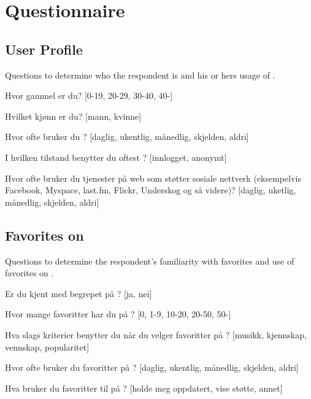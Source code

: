 \chapter{Questionnaire}
\label{appendix:questionnaire}

\section{User Profile}

Questions to determine who the respondent is and his or hers usage of
\urort{}.

\begin{items}
  \item Hvor gammel er du? [0-19, 20-29, 30-40, 40-]
  \item Hvilket kjønn er du? [mann, kvinne]
  \item Hvor ofte bruker du \urort{}?
    [daglig, ukentlig, månedlig, skjelden, aldri]
  \item I hvilken tilstand benytter du oftest \urort{}? [innlogget, anonymt]
  \item Hvor ofte bruker du tjenester på web som støtter sosiale
    nettverk (eksempelvis Facebook, Myspace, last.fm, Flickr, Underskog
    og så videre)?
    [daglig, uketlig, månedlig, skjelden, aldri]
\end{items}

\section{Favorites on \urort{}}

Questions to determine the respondent's familiarity with favorites and use of
favorites on \urort{}.

\begin{items}
  \item Er du kjent med begrepet  på \urort{}? [ja, nei]
  \item Hvor mange favoritter har du på \urort{}? [0, 1-9, 10-20, 20-50, 50-]
  \item Hva slags kriterier benytter du når du velger favoritter på
    \urort{}? [musikk, kjennskap, vennskap, popularitet]
  \item Hvor ofte bruker du favoritter på \urort{}?
    [daglig, ukentlig, månedlig, skjelden, aldri]
  \item Hva bruker du favoritter til på \urort{}?
    [holde meg oppdatert, vise støtte, annet]
\end{items}

